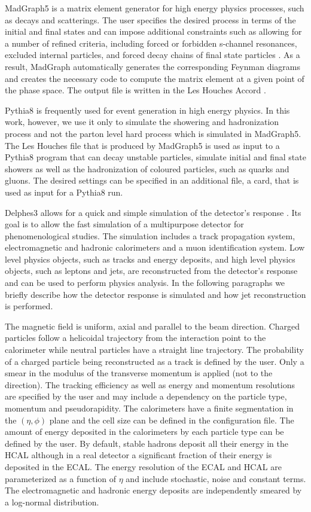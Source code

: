 MadGraph5 is a matrix element generator for high energy physics processes, such as decays and scatterings. The user specifies the desired process in terms of the initial and final states and can impose additional constraints such as allowing for a number of refined criteria, including forced or forbidden s-channel resonances, excluded internal particles, and forced decay chains of final state particles \cite{MG5}. As a result, MadGraph automatically generates the corresponding Feynman diagrams and creates the necessary code to compute the matrix element at a given point of the phase space. The output file is written in the Les Houches Accord \cite{lhe}.

Pythia8 is frequently used for event generation in high energy physics. In this work, however, we use it only to simulate the showering and hadronization process and not the parton level hard process which is simulated in MadGraph5. The Les Houches file that is produced by MadGraph5 is used as input to a Pythia8 program that can decay unstable particles, simulate initial and final state showers as well as the hadronization of coloured particles, such as quarks and gluons. The desired settings can be specified in an additional file, a card, that is used as input for a Pythia8 run.

Delphes3 allows for a quick and simple simulation of the detector's response \cite{Delphes}. Its goal is to allow the fast simulation of a multipurpose detector for phenomenological studies. The simulation includes a track propagation system, electromagnetic and hadronic calorimeters and a muon identification system. Low level physics objects, such as tracks and energy deposits, and high level physics objects, such as leptons and jets, are reconstructed from the detector's response and can be used to perform physics analysis. In the following paragraphs we briefly describe how the detector response is simulated and how jet reconstruction is performed.  

The magnetic field is uniform, axial and parallel to the beam direction. Charged particles follow a helicoidal trajectory from the interaction point to the calorimeter while neutral particles have a straight line trajectory. The probability of a charged particle being reconstructed as a track is defined by the user. Only a smear in the modulus of the transverse momentum is applied (not to the direction). The tracking efficiency as well as energy and momentum resolutions are specified by the user and may include a dependency on the particle type, momentum and pseudorapidity. The calorimeters have a finite segmentation in the $(\eta,\phi)$ plane and the cell size can be defined in the configuration file. The amount of energy deposited in the calorimeters by each particle type can be defined by the user. By default, stable hadrons deposit all their energy in the HCAL although in a real detector a significant fraction of their energy is deposited in the ECAL. The energy resolution of the ECAL and HCAL are parameterized as a function of $\eta$ and include stochastic, noise and constant terms. The electromagnetic and hadronic energy deposits are independently smeared by a log-normal distribution. 

